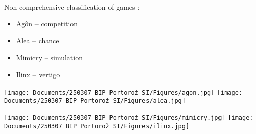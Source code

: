 \begin{frame}{\insertsection\ \insertsubsection}
    \onslide<+->

    \begin{multicols}{2}
        Non-comprehensive classification of games \cite{caillois2001ManPlayGames}:
    
        \begin{itemize}
            \item Ag\^{o}n -- competition
            \item Alea -- chance
            \item Mimicry -- simulation
            \item Ilinx -- vertigo
        \end{itemize}

        \columnbreak

        \begin{center}
                \texttt{[image: Documents/250307 BIP Portorož SI/Figures/agon.jpg]}
            \hspace{1em}
                \texttt{[image: Documents/250307 BIP Portorož SI/Figures/alea.jpg]}
    
            \vspace{1em}
            
            \noindent
                \texttt{[image: Documents/250307 BIP Portorož SI/Figures/mimicry.jpg]}
            \hspace{1em}
                \texttt{[image: Documents/250307 BIP Portorož SI/Figures/ilinx.jpg]}
        \end{center}

    \end{multicols}
\end{frame}

\begin{frame}[standout]
    \onslide<+->
\end{frame}
